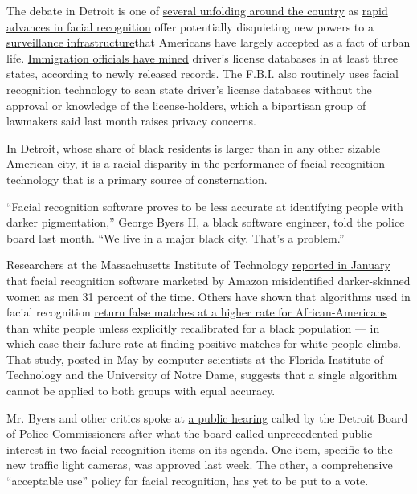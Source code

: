 The debate in Detroit is one of
\href{https://www.nytimes.com/2019/07/01/us/facial-recognition-san-francisco.html}{several
unfolding around the country} as
\href{https://www.nytimes.com/2017/11/28/technology/artificial-intelligence-research-toronto.html}{rapid
advances in facial recognition} offer potentially disquieting new powers
to a
\href{https://www.nytimes.com/2018/05/26/us/chicago-police-surveillance.html}{surveillance
infrastructure}that Americans have largely accepted as a fact of urban
life.
\href{https://www.nytimes.com/2019/07/07/us/politics/ice-drivers-licenses-facial-recognition.html}{Immigration
officials have mined} driver's license databases in at least three
states, according to newly released records. The F.B.I. also routinely
uses facial recognition technology to scan state driver's license
databases without the approval or knowledge of the license-holders,
which a bipartisan group of lawmakers said last month raises privacy
concerns.

In Detroit, whose share of black residents is larger than in any other
sizable American city, it is a racial disparity in the performance of
facial recognition technology that is a primary source of consternation.

``Facial recognition software proves to be less accurate at identifying
people with darker pigmentation,'' George Byers II, a black software
engineer, told the police board last month. ``We live in a major black
city. That's a problem.''

Researchers at the Massachusetts Institute of Technology
\href{https://www.nytimes.com/2019/01/24/technology/amazon-facial-technology-study.html}{reported
in January} that facial recognition software marketed by Amazon
misidentified darker-skinned women as men 31 percent of the time. Others
have shown that algorithms used in facial recognition
\href{https://arxiv.org/pdf/1904.07325.pdf}{return false matches at a
higher rate for African-Americans} than white people unless explicitly
recalibrated for a black population --- in which case their failure rate
at finding positive matches for white people climbs.
\href{https://arxiv.org/pdf/1904.07325.pdf}{That study}, posted in May
by computer scientists at the Florida Institute of Technology and the
University of Notre Dame, suggests that a single algorithm cannot be
applied to both groups with equal accuracy.

Mr. Byers and other critics spoke at
\href{http://video.detroitmi.gov/CablecastPublicSite/show/7361?channel=3}{a
public hearing} called by the Detroit Board of Police Commissioners
after what the board called unprecedented public interest in two facial
recognition items on its agenda. One item, specific to the new traffic
light cameras, was approved last week. The other, a comprehensive
``acceptable use'' policy for facial recognition, has yet to be put to a
vote.

